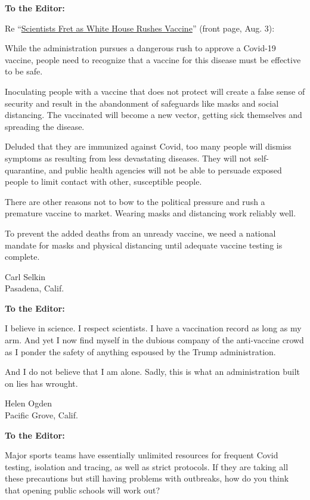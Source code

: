 \textbf{To the Editor:}

Re
``\href{https://www.nytimes.com/2020/08/02/us/politics/coronavirus-vaccine.html?searchResultPosition=1}{Scientists
Fret as White House Rushes Vaccine}'' (front page, Aug. 3):

While the administration pursues a dangerous rush to approve a Covid-19
vaccine, people need to recognize that a vaccine for this disease must
be effective to be safe.

Inoculating people with a vaccine that does not protect will create a
false sense of security and result in the abandonment of safeguards like
masks and social distancing. The vaccinated will become a new vector,
getting sick themselves and spreading the disease.

Deluded that they are immunized against Covid, too many people will
dismiss symptoms as resulting from less devastating diseases. They will
not self-quarantine, and public health agencies will not be able to
persuade exposed people to limit contact with other, susceptible people.

There are other reasons not to bow to the political pressure and rush a
premature vaccine to market. Wearing masks and distancing work reliably
well.

To prevent the added deaths from an unready vaccine, we need a national
mandate for masks and physical distancing until adequate vaccine testing
is complete.

Carl Selkin\\
Pasadena, Calif.

\textbf{To the Editor:}

I believe in science. I respect scientists. I have a vaccination record
as long as my arm. And yet I now find myself in the dubious company of
the anti-vaccine crowd as I ponder the safety of anything espoused by
the Trump administration.

And I do not believe that I am alone. Sadly, this is what an
administration built on lies has wrought.

Helen Ogden\\
Pacific Grove, Calif.

\textbf{To the Editor:}

Major sports teams have essentially unlimited resources for frequent
Covid testing, isolation and tracing, as well as strict protocols. If
they are taking all these precautions but still having problems with
outbreaks, how do you think that opening public schools will work out?

